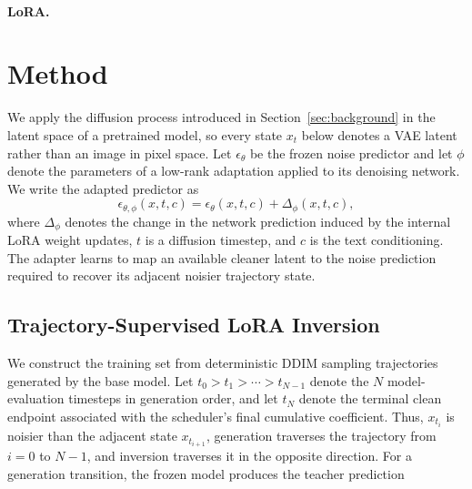 \documentclass{article} %
\newcommand{\ls}[1]{{\color{red}{LS: #1}}}
\begin{document}
\paragraph{LoRA.} 

\ls{describe here LoRA + these 2-3 methods that combine it with inversion? \begin{enumerate}
    \item FlashIn: Fast and Accurate Image Inversion for Real-time Image Editing
    \item BiFM: Bidirectional Flow Matching for Few-Step Image Editing and Generation
    \item DeepInv: A Novel Self-supervised Learning Approach for Fast and Accurate Diffusion Inversion
2\end{enumerate}}

\section{Method}
We apply the diffusion process introduced in Section~\ref{sec:background} in the latent space of a pretrained model, so every state $x_t$ below denotes a VAE latent rather than an image in pixel space. Let $\epsilon_\theta$ be the frozen noise predictor and let $\phi$ denote the parameters of a low-rank adaptation applied to its denoising network. We write the adapted predictor as
\[
\epsilon_{\theta,\phi}(x,t,c)
=
\epsilon_\theta(x,t,c)
+
\Delta_\phi(x,t,c),
\]
where $\Delta_\phi$ denotes the change in the network prediction induced by the internal LoRA weight updates, $t$ is a diffusion timestep, and $c$ is the text conditioning. The adapter learns to map an available cleaner latent to the noise prediction required to recover its adjacent noisier trajectory state.

\subsection{Trajectory-Supervised LoRA Inversion}
\label{sec:trajectory-objective}
We construct the training set from deterministic DDIM sampling trajectories generated by the base model. Let $t_0>t_1>\cdots>t_{N-1}$ denote the $N$ model-evaluation timesteps in generation order, and let $t_N$ denote the terminal clean endpoint associated with the scheduler's final cumulative coefficient. Thus, $x_{t_i}$ is noisier than the adjacent state $x_{t_{i+1}}$, generation traverses the trajectory from $i=0$ to $N-1$, and inversion traverses it in the opposite direction. For a generation transition, the frozen model produces the teacher prediction
\end{document}
